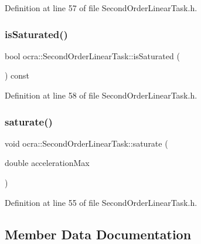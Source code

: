 Definition at line 57 of file Second\+Order\+Linear\+Task.\+h.

\hypertarget{classocra_1_1SecondOrderLinearTask_a4f688efc6873334cfac467edd4fe4481}{}\label{classocra_1_1SecondOrderLinearTask_a4f688efc6873334cfac467edd4fe4481} 
\subsubsection{\texorpdfstring{is\+Saturated()}{isSaturated()}}
{\footnotesize\ttfamily bool ocra\+::\+Second\+Order\+Linear\+Task\+::is\+Saturated (\begin{DoxyParamCaption}{ }\end{DoxyParamCaption}) const\hspace{0.3cm}{\ttfamily [inline]}}



Definition at line 58 of file Second\+Order\+Linear\+Task.\+h.

\hypertarget{classocra_1_1SecondOrderLinearTask_ad49dff8c7451d4753126328d3a47e4ba}{}\label{classocra_1_1SecondOrderLinearTask_ad49dff8c7451d4753126328d3a47e4ba} 
\subsubsection{\texorpdfstring{saturate()}{saturate()}}
{\footnotesize\ttfamily void ocra\+::\+Second\+Order\+Linear\+Task\+::saturate (\begin{DoxyParamCaption}\item[{double}]{acceleration\+Max }\end{DoxyParamCaption})\hspace{0.3cm}{\ttfamily [inline]}}



Definition at line 55 of file Second\+Order\+Linear\+Task.\+h.



\subsection{Member Data Documentation}
\hypertarget{classocra_1_1SecondOrderLinearTask_aec8499eb3b78b46a1170d43f427a53a9}{}\label{classocra_1_1SecondOrderLinearTask_aec8499eb3b78b46a1170d43f427a53a9} 
